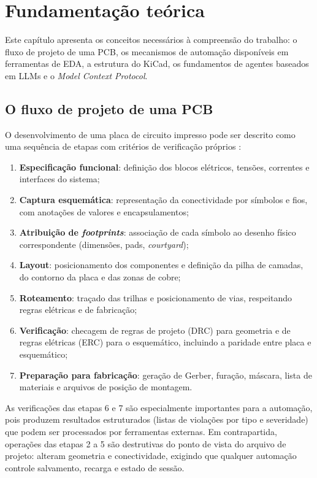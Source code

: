 \chapter{Fundamentação teórica}\label{cap:fundamentacao}

Este capítulo apresenta os conceitos necessários à compreensão do trabalho:
o fluxo de projeto de uma PCB, os mecanismos de automação disponíveis em
ferramentas de EDA, a estrutura do KiCad, os fundamentos de agentes baseados
em LLMs e o \emph{Model Context Protocol}.

\section{O fluxo de projeto de uma PCB}

O desenvolvimento de uma placa de circuito impresso pode ser descrito como uma
sequência de etapas com critérios de verificação próprios
\citep{kicaddocs,horowitz2015}:

\begin{enumerate}[leftmargin=1.4em,itemsep=0.2em]
  \item \textbf{Especificação funcional}: definição dos blocos elétricos,
        tensões, correntes e interfaces do sistema;
  \item \textbf{Captura esquemática}: representação da conectividade por
        símbolos e fios, com anotações de valores e encapsulamentos;
  \item \textbf{Atribuição de \emph{footprints}}: associação de cada símbolo
        ao desenho físico correspondente (dimensões, pads, \emph{courtyard});
  \item \textbf{Layout}: posicionamento dos componentes e definição da pilha
        de camadas, do contorno da placa e das zonas de cobre;
  \item \textbf{Roteamento}: traçado das trilhas e posicionamento de vias,
        respeitando regras elétricas e de fabricação;
  \item \textbf{Verificação}: checagem de regras de projeto (DRC) para
        geometria e de regras elétricas (ERC) para o esquemático, incluindo a
        paridade entre placa e esquemático;
  \item \textbf{Preparação para fabricação}: geração de Gerber, furação,
        máscara, lista de materiais e arquivos de posição de montagem.
\end{enumerate}

As verificações das etapas 6 e 7 são especialmente importantes para a
automação, pois produzem resultados estruturados (listas de violações por
tipo e severidade) que podem ser processados por ferramentas externas. Em
contrapartida, operações das etapas 2 a 5 são destrutivas do ponto de vista do
arquivo de projeto: alteram geometria e conectividade, exigindo que qualquer
automação controle salvamento, recarga e estado de sessão.

